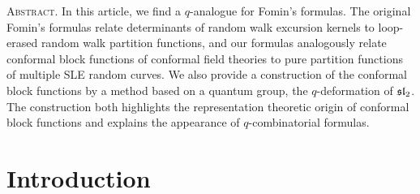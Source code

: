 \documentclass[oneside,english]{amsart}
\numberwithin{equation}{section}
\numberwithin{figure}{section}
\theoremstyle{plain}
\theoremstyle{plain}
\theoremstyle{plain}
\theoremstyle{remark}
\theoremstyle{plain}
\theoremstyle{plain}
\theoremstyle{plain}
\theoremstyle{plain}
\theoremstyle{plain}
\theoremstyle{plain}
\theoremstyle{plain}
\theoremstyle{plain}
\begin{document}
\begin{center}
\begin{minipage}{0.85\textwidth} \footnotesize
{\scshape Abstract.}
In this article, we find a $q$-analogue for Fomin's formulas.
The original Fomin's formulas relate determinants of random walk
excursion kernels to loop-erased random walk partition functions,
and our formulas analogously relate conformal block functions of
conformal field theories to pure partition functions of multiple SLE
random curves.
We also provide a construction of the conformal block functions by a
method based on a quantum group, the $q$-deformation of $\mathfrak{sl}_2$.
The construction both highlights the representation theoretic origin of conformal
block functions and explains the appearance of $q$-combinatorial formulas.
\end{minipage}
\end{center}





\bigskip{}


% 
% 






\section{Introduction}
\end{document}
